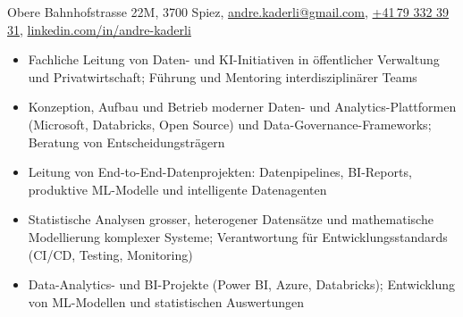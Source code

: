 \documentclass{cv}
\begin{document}
	\begin{contactline}
		Obere Bahnhofstrasse 22M, 3700 Spiez\sep
		\href{mailto:andre.kaderli@gmail.com}{andre.kaderli@gmail.com}\sep
		\href{tel:+41793323931}{+41\,79 332 39 31}\sep
		\href{https://www.linkedin.com/in/andre-kaderli/}{linkedin.com/in/andre-kaderli}
	\end{contactline}



	\begin{itemize}
		\item Fachliche Leitung von Daten- und KI-Initiativen in öffentlicher Verwaltung und Privatwirtschaft; Führung und Mentoring interdisziplinärer Teams
		\item Konzeption, Aufbau und Betrieb moderner Daten- und Analytics-Plattformen (Microsoft, Databricks, Open Source) und Data-Governance-Frameworks; Beratung von Entscheidungsträgern
	\end{itemize}

	\begin{itemize}
		\item Leitung von End-to-End-Datenprojekten: Datenpipelines, BI-Reports, produktive ML-Modelle und intelligente Datenagenten
		\item Statistische Analysen grosser, heterogener Datensätze und mathematische Modellierung komplexer Systeme; Verantwortung für Entwicklungsstandards (CI/CD, Testing, Monitoring)
	\end{itemize}

	\begin{itemize}
		\item Data-Analytics- und BI-Projekte (Power BI, Azure, Databricks); Entwicklung von ML-Modellen und statistischen Auswertungen
	\end{itemize}
\end{document}
